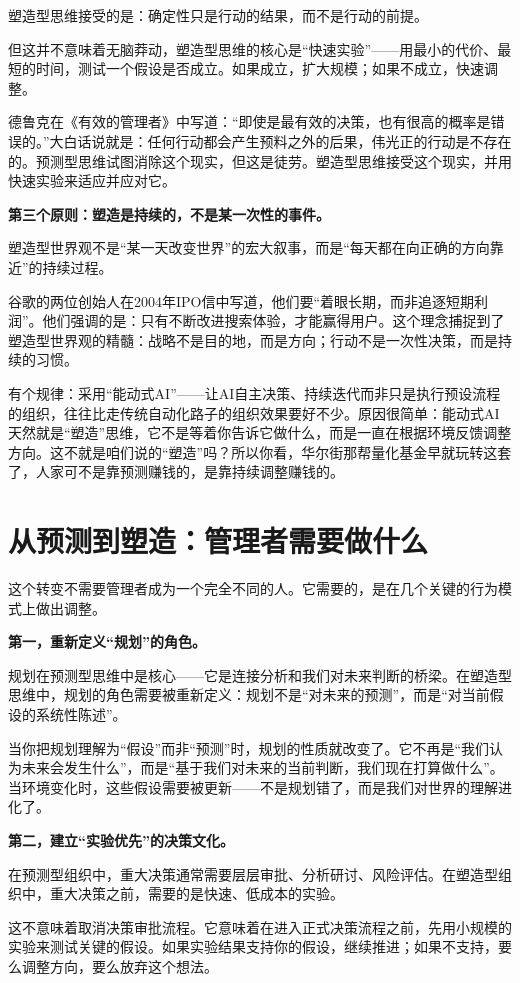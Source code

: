 塑造型思维接受的是：确定性只是行动的结果，而不是行动的前提。

但这并不意味着无脑莽动，塑造型思维的核心是“快速实验”——用最小的代价、最短的时间，测试一个假设是否成立。如果成立，扩大规模；如果不成立，快速调整。

德鲁克在《有效的管理者》中写道：“即使是最有效的决策，也有很高的概率是错误的。”大白话说就是：任何行动都会产生预料之外的后果，伟光正的行动是不存在的。预测型思维试图消除这个现实，但这是徒劳。塑造型思维接受这个现实，并用快速实验来适应并应对它。

\textbf{第三个原则：塑造是持续的，不是某一次性的事件。}

塑造型世界观不是“某一天改变世界”的宏大叙事，而是“每天都在向正确的方向靠近”的持续过程。

谷歌的两位创始人在2004年IPO信中写道，他们要“着眼长期，而非追逐短期利润”。他们强调的是：只有不断改进搜索体验，才能赢得用户。这个理念捕捉到了塑造型世界观的精髓：战略不是目的地，而是方向；行动不是一次性决策，而是持续的习惯。

有个规律：采用“能动式AI”——让AI自主决策、持续迭代而非只是执行预设流程的组织，往往比走传统自动化路子的组织效果要好不少。原因很简单：能动式AI天然就是“塑造”思维，它不是等着你告诉它做什么，而是一直在根据环境反馈调整方向。这不就是咱们说的“塑造”吗？所以你看，华尔街那帮量化基金早就玩转这套了，人家可不是靠预测赚钱的，是靠持续调整赚钱的。


\section{从预测到塑造：管理者需要做什么}


这个转变不需要管理者成为一个完全不同的人。它需要的，是在几个关键的行为模式上做出调整。

\textbf{第一，重新定义“规划”的角色。}

规划在预测型思维中是核心——它是连接分析和我们对未来判断的桥梁。在塑造型思维中，规划的角色需要被重新定义：规划不是“对未来的预测”，而是“对当前假设的系统性陈述”。

当你把规划理解为“假设”而非“预测”时，规划的性质就改变了。它不再是“我们认为未来会发生什么”，而是“基于我们对未来的当前判断，我们现在打算做什么”。当环境变化时，这些假设需要被更新——不是规划错了，而是我们对世界的理解进化了。

\textbf{第二，建立“实验优先”的决策文化。}

在预测型组织中，重大决策通常需要层层审批、分析研讨、风险评估。在塑造型组织中，重大决策之前，需要的是快速、低成本的实验。

这不意味着取消决策审批流程。它意味着在进入正式决策流程之前，先用小规模的实验来测试关键的假设。如果实验结果支持你的假设，继续推进；如果不支持，要么调整方向，要么放弃这个想法。

